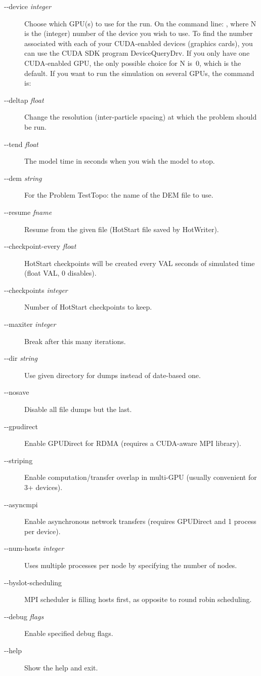 \begin{description}
\item [-{}-device \emph{integer}]
Choose which GPU(s) to use for the run.
On the command line: , where N is the
(integer) number of the device you wish to use. 
To find the number associated with each of your CUDA-enabled 
devices (graphics cards), you
can use the CUDA SDK program DeviceQueryDrv. If you only have one
CUDA-enabled GPU, the only possible choice for N is~0, which is the
default.
If you want to run the simulation on several GPUs, the command is:
\item [-{}-deltap \emph{float}]
Change the resolution (inter-particle spacing) at which the problem
should be run.
\item [-{}-tend \emph{float}]
The model time in seconds when you wish the model to stop.
\item [-{}-dem \emph{string}]
For the Problem TestTopo: the name of the DEM file to use.
\item [-{}-resume \emph{fname}]
Resume from the given file (HotStart file saved by HotWriter).
\item [-{}-checkpoint-every \emph{float}]
HotStart checkpoints will be created every VAL seconds of simulated time (float VAL, 0 disables).
\item [-{}-checkpoints \emph{integer}]
Number of HotStart checkpoints to keep.
\item [-{}-maxiter \emph{integer}]
Break after this many iterations.
\item [-{}-dir \emph{string}]
Use given directory for dumps instead of date-based one.
\item [-{}-nosave]
Disable all file dumps but the last.
\item [-{}-gpudirect]
Enable GPUDirect for RDMA (requires a CUDA-aware MPI library).
\item [-{}-striping]
Enable computation/transfer overlap in multi-GPU (usually convenient for 3+ devices).
\item [-{}-asyncmpi]
Enable asynchronous network transfers (requires GPUDirect and 1 process per device).
\item [-{}-num-hosts \emph{integer}]
Uses multiple processes per node by specifying the number of nodes.
\item [-{}-byslot-scheduling]
MPI scheduler is filling hosts first, as opposite to round robin scheduling.
\item [-{}-debug \emph{flags}]
Enable specified debug flags.
\item [-{}-help]
Show the help and exit.
\end{description}


